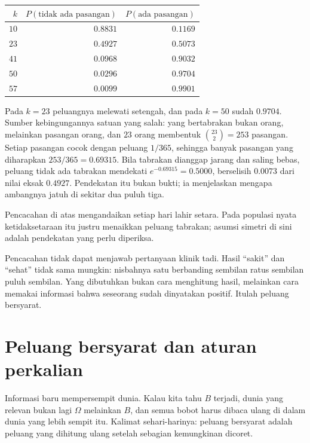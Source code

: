 
\begin{center}
\small
\begin{tabular}{rrr}
\hline
$k$ & $P(\text{tidak ada pasangan})$ & $P(\text{ada pasangan})$ \\
\hline
$10$ & $0.8831$ & $0.1169$ \\
$23$ & $0.4927$ & $0.5073$ \\
$41$ & $0.0968$ & $0.9032$ \\
$50$ & $0.0296$ & $0.9704$ \\
$57$ & $0.0099$ & $0.9901$ \\
\hline
\end{tabular}
\end{center}

Pada $k=23$ peluangnya melewati setengah, dan pada $k=50$ sudah $0.9704$. Sumber
kebingungannya satuan yang salah: yang bertabrakan bukan orang, melainkan pasangan orang,
dan $23$ orang membentuk $\binom{23}{2}=253$ pasangan. Setiap pasangan cocok dengan
peluang $1/365$, sehingga banyak pasangan yang diharapkan $253/365=0.69315$. Bila
tabrakan dianggap jarang dan saling bebas, peluang tidak ada tabrakan mendekati
$e^{-0.69315}=0.5000$, berselisih $0.0073$ dari nilai eksak $0.4927$. Pendekatan itu
bukan bukti; ia menjelaskan mengapa ambangnya jatuh di sekitar dua puluh tiga.

Pencacahan di atas mengandaikan setiap hari lahir setara. Pada populasi nyata
ketidaksetaraan itu justru menaikkan peluang tabrakan; asumsi simetri di sini adalah
pendekatan yang perlu diperiksa.

Pencacahan tidak dapat menjawab pertanyaan klinik tadi. Hasil ``sakit'' dan ``sehat''
tidak sama mungkin: nisbahnya satu berbanding sembilan ratus sembilan puluh sembilan.
Yang dibutuhkan bukan cara menghitung hasil, melainkan cara memakai informasi bahwa
seseorang sudah dinyatakan positif. Itulah peluang bersyarat.

\section{Peluang bersyarat dan aturan perkalian}

Informasi baru mempersempit dunia. Kalau kita tahu $B$ terjadi, dunia yang relevan bukan
lagi $\Omega$ melainkan $B$, dan semua bobot harus dibaca ulang di dalam dunia yang lebih
sempit itu. Kalimat sehari-harinya: peluang bersyarat adalah peluang yang dihitung ulang
setelah sebagian kemungkinan dicoret.

